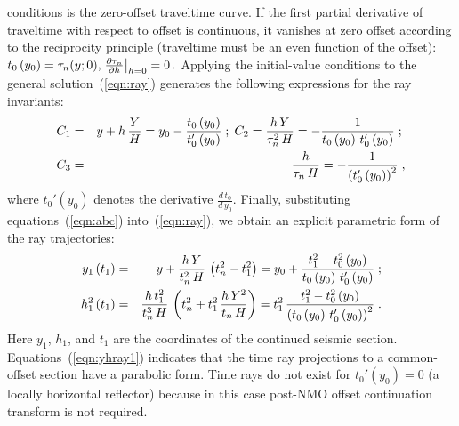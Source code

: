 conditions is the zero-offset traveltime curve. If the first partial
derivative of traveltime with respect to offset is continuous, it
vanishes at zero offset according to the reciprocity principle
(traveltime must be an even function of the offset):
\begin{math}
t_0\left(y_0\right)=\tau_n(y;0), 
\left. {\partial \tau_n \over \partial h} \right|_{h=0}=0\,.  
\end{math}
Applying the initial-value conditions to the general
solution~(\ref{eqn:ray}) generates the following expressions for the
ray invariants:
\begin{eqnarray}
C_1 & = & y+h\,{Y \over H}=y_0-{t_0\left(y_0\right) \over
t_0'\left(y_0\right)}\;;\;
C_2={{h\,Y} \over {\tau_n^2\,H}}=
-{1 \over t_0\left(y_0\right)\,t_0'\left(y_0\right)}\;;\;
\nonumber \\
C_3 & = & {h \over {\tau_n\,H}}=
-{1 \over \left(t_0'\left(y_0\right)\right)^2}\;,
\label{eqn:abc} 
\end{eqnarray}
where $t_0'\left(y_0\right)$ denotes the derivative
$\frac{d\,t_0}{d\,y_0}$.  Finally, substituting
equations~(\ref{eqn:abc})
into~(\ref{eqn:ray}), we obtain an explicit parametric form of the ray
trajectories:
\begin{eqnarray}
\label{eqn:yhray1}
y_1\left(t_1\right)  & = & \displaystyle{y+{{h\,Y} \over
{t_n^2\,H}}\,\left(t_n^2-t_1^2\right)= y_0+{{t_1^2-t_0^2\left(y_0\right)} \over
{t_0\left(y_0\right)\,t_0'\left(y_0\right)}}}\;;
\\
h_1^2\left(t_1\right) & = & \displaystyle{{{h\,t_1^2} \over {t_n^3\,H}}\,
\left(t_n^2+t_1^2\,{{h\,Y^2} \over {t_n\,H}}\right)=
t_1^2\,{{t_1^2-t_0^2\left(y_0\right)} \over
{\left(t_0\left(y_0\right)\,t_0'\left(y_0\right)\right)^2}}}\;.
\label{eqn:yhray2}
\end{eqnarray}
Here $y_1$, $h_1$, and $t_1$ are the coordinates of the continued
seismic section. Equations~(\ref{eqn:yhray1}) indicates
that the time ray projections to a common-offset section have a
parabolic form. Time rays do not exist for $t_0'\left(y_0\right)=0$ (a
locally horizontal reflector) because in this case post-NMO offset
continuation transform is not required.

